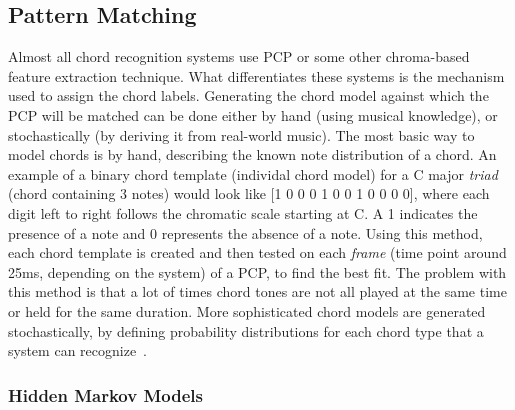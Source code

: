 \documentclass{sig-alternate}
\begin{document}
\subsection{Pattern Matching}

Almost all chord recognition systems use PCP or some other chroma-based feature extraction technique. What differentiates these systems is the mechanism used to assign the chord labels. Generating the chord model against which the PCP will be matched can be done either by hand (using musical knowledge), or stochastically (by deriving it from real-world music). The most basic way to model chords is by hand, describing the known note distribution of a chord. An example of a binary chord template (individal chord model) for a C major \textit{triad} (chord containing 3 notes) would look like [1 0 0 0 1 0 0 1 0 0 0 0], where each digit left to right follows the chromatic scale starting at C. A 1 indicates the presence of a note and 0 represents the absence of a note. Using this method, each chord template is created and then tested on each \textit{frame} (time point around 25ms, depending on the system) of a PCP, to find the best fit. The problem with this method is that a lot of times chord tones are not all played at the same time or held for the same duration. More sophisticated chord models are generated stochastically, by defining probability distributions for each chord type that a system can recognize~\cite{TaeMin:2014}.  



\subsubsection{Hidden Markov Models}\label{main} 
\end{document}
